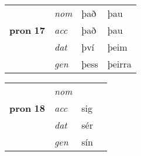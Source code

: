 \begin{center}
\begin{minipage}[t]{.45\textwidth}
\begin{tabular}{l>{\footnotesize\itshape}lll}
\multirow{3}{*}{{{\textbf{pron} \Large{\textbf{17}}}}}  &  nom & það & þau   \\*
 & acc &  það  & þau  \\*
 & dat & því & þeim   \\*
 & gen & þess  & þeirra  \\
\hline
\end{tabular}
\end{minipage}\hfil
\begin{minipage}[t]{.45\textwidth}
\begin{tabular}{l>{\footnotesize\itshape}lll}
\hline
\multirow{3}{*}{{{\textbf{pron} \Large{\textbf{18}}}}}  &  nom &  &    \\*
 & acc &  sig  &   \\*
 & dat & sér &    \\*
 & gen & sín  &   \\
 \hline
\end{tabular}
\end{minipage}
\end{center}

